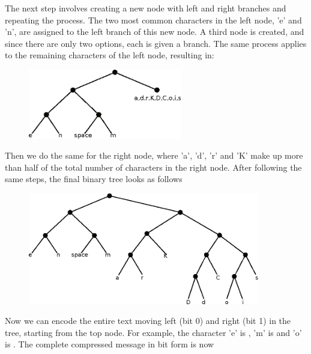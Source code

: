 \documentclass[book.tex]{subfiles}
\begin{document}
The next step involves creating a new node with left and right branches and repeating the process. The two most common characters in the left node, 'e' and 'n', are assigned to the left branch of this new node. A third node is created, and since there are only two options, each is given a branch. The same process applies to the remaining characters of the left node, resulting in:\\

\begin{figure}[H]
\centering
 \includegraphics[width=0.6\textwidth]{imgs/drawings/huffman_tree_2.eps}
 \end{figure}
 \par
 
 Then we do the same for the right node, where 'a', 'd', 'r' and 'K' make up more than half of the total number of characters in the right node. After following the same steps, the final binary tree looks as follows\\
 
\begin{figure}[H]
\centering
 \includegraphics[width=0.9\textwidth]{imgs/drawings/huffman_tree_3.eps}
 \end{figure}
 \par


Now we can encode the entire text moving left (bit 0) and right (bit 1) in the tree, starting from the top node. For example, the character 'e' is , 'm' is  and 'o' is . The complete compressed message in bit form is now\\
\end{document}
